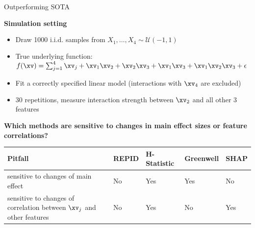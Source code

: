 \documentclass[11pt,compress,t,notes=noshow, aspectratio=169, xcolor=table,dvipsnames]{beamer}
\begin{document}
\begin{frame}{Outperforming SOTA}

\textbf{Simulation setting}
\begin{itemize}
    \item Draw 1000 i.i.d. samples from $X_1, \ldots , X_4 \sim \mathcal{U}(-1,1)$
    \item True underlying function: $f(\xv) = \sum\nolimits_{j=1}^4 \xv_j + \xv_1 \xv_2 + \xv_2 \xv_3 + \xv_1 \xv_3 + \xv_1 \xv_2 \xv_3 + \epsilon$ %
    \item Fit a correctly specified linear model (interactions with $\xv_4$ are excluded)
    \item 30 repetitions, measure interaction strength between $\xv_2$ and all other 3 features
\end{itemize}

\textbf{Which methods are sensitive to changes in main effect sizes or feature correlations?}


    \begin{table}[thb]
\vspace{.1in}
    \label{tab:simSummary}
    \begin{center}
    \begin{tabular}{|p{5.4cm}|p{1.6cm}|p{1.8cm}|p{1.6cm}|p{1.6cm}|}
    \hline
       Pitfall & REPID & H-Statistic & Greenwell & SHAP  \\\hline
       sensitive to changes of main effect & No & Yes & Yes & No\\\hline
       sensitive to changes of correlation between $\xv_j$ and other features & No & Yes & No & Yes\\
  \hline
    \end{tabular}
    \end{center}
\end{table}
\vspace*{0.2cm}




\end{frame}
\end{document}
